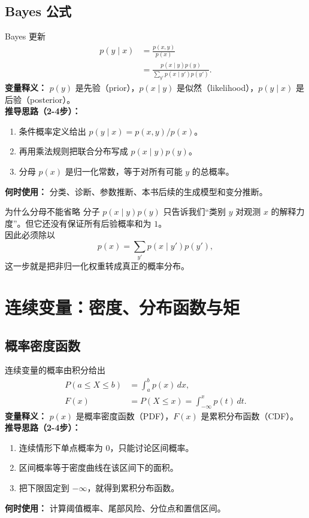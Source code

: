 \documentclass[11pt]{article}
\begin{document}
\subsection{Bayes 公式}
\begin{formulabox}{Bayes 更新}
\begin{align}
  p(y\mid x) &= \frac{p(x,y)}{p(x)} \\
             &= \frac{p(x\mid y)p(y)}{\sum_{y'} p(x\mid y')p(y')}.
\end{align}
\textbf{变量释义：} $p(y)$ 是先验（prior），$p(x\mid y)$ 是似然（likelihood），$p(y\mid x)$ 是后验（posterior）。\\
\textbf{推导思路（2-4步）：}
\begin{enumerate}[leftmargin=1.6em]
  \item 条件概率定义给出 $p(y\mid x)=p(x,y)/p(x)$。
  \item 再用乘法规则把联合分布写成 $p(x\mid y)p(y)$。
  \item 分母 $p(x)$ 是归一化常数，等于对所有可能 $y$ 的总概率。
\end{enumerate}
\textbf{何时使用：} 分类、诊断、参数推断、本书后续的生成模型和变分推断。
\end{formulabox}

\begin{derivationbox}{为什么分母不能省略}
分子 $p(x\mid y)p(y)$ 只告诉我们“类别 $y$ 对观测 $x$ 的解释力度”。但它还没有保证所有后验概率和为 $1$。\\
因此必须除以
\[
p(x)=\sum_{y'} p(x\mid y')p(y'),
\]
这一步就是把非归一化权重转成真正的概率分布。
\end{derivationbox}

\section{连续变量：密度、分布函数与矩}
\subsection{概率密度函数}
\begin{formulabox}{连续变量的概率由积分给出}
\begin{align}
P(a\le X\le b)&=\int_a^b p(x)\,dx,\\
F(x)&=P(X\le x)=\int_{-\infty}^{x} p(t)\,dt.
\end{align}
\textbf{变量释义：} $p(x)$ 是概率密度函数（PDF），$F(x)$ 是累积分布函数（CDF）。\\
\textbf{推导思路（2-4步）：}
\begin{enumerate}[leftmargin=1.6em]
  \item 连续情形下单点概率为 $0$，只能讨论区间概率。
  \item 区间概率等于密度曲线在该区间下的面积。
  \item 把下限固定到 $-\infty$，就得到累积分布函数。
\end{enumerate}
\textbf{何时使用：} 计算阈值概率、尾部风险、分位点和置信区间。
\end{formulabox}
\end{document}
